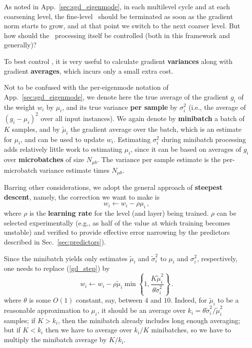 \documentclass{article} %
\begin{document}
As noted in App.~\ref{sec:sgd_eigenmode}, in each multilevel cycle and at each coarsening level, the fine-level \SGD~should be terminated as soon as the gradient norm starts to grow, and at that point we switch to the next coarser level. But how should the \SGD~processing itself be controlled (both in this framework and generally)?

To best control \SGD, it is very useful to calculate gradient \textbf{variances} along with gradient \textbf{averages}, which incurs only a small extra cost.

Not to be confused with the per-eigenmode notation of App.~\ref{sec:sgd_eigenmode}, we denote here the true average of the gradient $g_i$ of the weight $w_i$ by $\mu_i$, and its true variance \textbf{per sample} by $\sigma_i^2$ (i.e., the average of $(g_i-\mu_i)^2$ over all input instances). We again denote by \textbf{minibatch} a batch of $K$ samples, and by $\tilde{\mu}_i$ the gradient average over the batch, which is an estimate for $\mu_i$, and can be used to update $w_i$. Estimating $\sigma_i^2$ during minibatch processing adds relatively little work to estimating $\mu_i$, since it can be based on averages of $g_i$ over \textbf{microbatches} of size $N_{\mu b}$. The variance per sample estimate is the per-microbatch variance estimate times $N_{\mu b}$.

Barring other considerations, we adopt the general approach of \textbf{steepest descent}, namely, the correction we want to make is
\begin{equation}
  w_i \longleftarrow w_i - \rho \mu_i\,,
  \label{gd_step}
\end{equation}
where $\rho$ is the \textbf{learning rate} for the level (and layer) being trained. $\rho$ can be selected  experimentally (e.g., as half of the value at which training becomes unstable) and verified to provide effective error narrowing by the predictors described in Sec.~\ref{sec:predictors}).

Since the minibatch yields only estimates $\tilde{\mu}_i$ and $\tilde{\sigma}_i^2$ to $\mu_i$ and $\sigma_i^2$, respectively, one needs to replace (\ref{gd_step}) by
\begin{equation}
  w_i \longleftarrow w_i - \rho \tilde{\mu}_i \min\left\{ 1, \frac{K \tilde{\mu}_i^2}{\theta \tilde{\sigma}_i^2} \right\}\,.
  \label{gd_step_k}
\end{equation}
where $\theta$ is some $O(1)$ constant, say, between $4$ and $10$. Indeed, for $\tilde{\mu}_i$ to be a reasonable approximation to $\mu_i$, it should be an average over $k_i = \theta \tilde{\sigma}_i^2/\tilde{\mu}_i^2$ samples; if $K > k_i$, then the minibatch already includes long enough averaging; but if $K < k_i$ then we have to average over $k_i/K$ minibatches, so we have to multiply the minibatch average by $K/k_i$.
\end{document}
